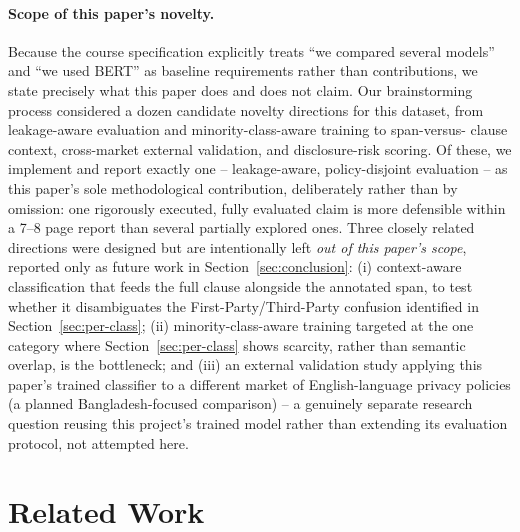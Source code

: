 \documentclass[11pt]{acl}
\begin{document}
\paragraph{Scope of this paper's novelty.} Because the course specification explicitly
treats ``we compared several models'' and ``we used BERT'' as baseline requirements
rather than contributions, we state precisely what this paper does and does not claim.
Our brainstorming process considered a dozen candidate novelty directions for this
dataset, from leakage-aware evaluation and minority-class-aware training to span-versus-
clause context, cross-market external validation, and disclosure-risk scoring. Of
these, we implement and report exactly one -- leakage-aware, policy-disjoint evaluation
-- as this paper's sole methodological contribution, deliberately rather than by
omission: one rigorously executed, fully evaluated claim is more defensible within a
7--8 page report than several partially explored ones. Three closely related directions
were designed but are intentionally left \emph{out of this paper's scope}, reported only
as future work in Section~\ref{sec:conclusion}: (i) context-aware classification that
feeds the full clause alongside the annotated span, to test whether it disambiguates the
First-Party/Third-Party confusion identified in Section~\ref{sec:per-class}; (ii)
minority-class-aware training targeted at the one category where
Section~\ref{sec:per-class} shows scarcity, rather than semantic overlap, is the
bottleneck; and (iii) an external validation study applying this paper's trained
classifier to a different market of English-language privacy policies (a planned
Bangladesh-focused comparison) -- a genuinely separate research question reusing this
project's trained model rather than extending its evaluation protocol, not attempted
here.

\section{Related Work}
\label{sec:related}
\end{document}

